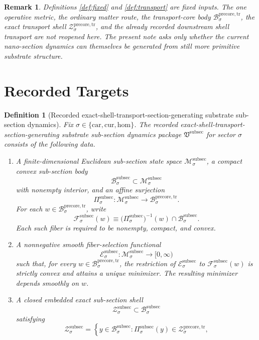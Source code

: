 \documentclass[11pt]{article}
\newcommand{\Car}{\mathrm{car}}
\newcommand{\Cur}{\mathrm{cur}}
\newcommand{\Hom}{\mathrm{hom}}
\newcommand{\PreCoreTrBody}[1]{\mathcal B_{#1}^{\mathrm{precore,tr}}}
\newcommand{\PreCoreTrShell}[1]{\mathcal Z_{#1}^{\mathrm{precore,tr}}}
\newcommand{\SubSectionPackage}{\mathfrak V^{\mathrm{subsec}}}
\newcommand{\SubSectionSpace}[1]{\mathcal M_{#1}^{\mathrm{subsec}}}
\newcommand{\SubSectionBody}[1]{\mathcal B_{#1}^{\mathrm{subsec}}}
\newcommand{\SubSectionProj}[1]{\Pi_{#1}^{\mathrm{subsec}}}
\newcommand{\SubSectionFiber}[2]{\mathcal F_{#1}^{\mathrm{subsec}}(#2)}
\newcommand{\SubSectionFunctional}[1]{\mathscr E_{#1}^{\mathrm{subsec}}}
\newcommand{\SubSectionShell}[1]{\mathcal Z_{#1}^{\mathrm{subsec}}}
\newtheorem{definition}{Definition}
\newtheorem{remark}{Remark}
\begin{document}
\begin{remark}
Definitions \ref{def:fixed} and \ref{def:transport} are fixed inputs. The one operative metric, the ordinary matter route, the transport-core body \(\PreCoreTrBody{\sigma}\), the exact transport shell \(\PreCoreTrShell{\sigma}\), and the already recorded downstream shell transport are not reopened here. The present note asks only whether the current nano-section dynamics can themselves be generated from still more primitive substrate structure.
\end{remark}

\section{Recorded Targets}

\begin{definition}[Recorded exact-shell-transport-section-generating substrate sub-section dynamics]
\label{def:subsec}
Fix \(\sigma\in\{\Car,\Cur,\Hom\}\). The recorded exact-shell-transport-section-generating substrate sub-section dynamics package \(\SubSectionPackage\) for sector \(\sigma\) consists of the following data.
\begin{enumerate}
    \item A finite-dimensional Euclidean sub-section state space \(\SubSectionSpace{\sigma}\), a compact convex sub-section body
    \[
    \SubSectionBody{\sigma}\subset\SubSectionSpace{\sigma}
    \]
    with nonempty interior, and an affine surjection
    \[
    \SubSectionProj{\sigma}:\SubSectionSpace{\sigma}\to\PreCoreTrBody{\sigma}.
    \]
    For each \(w\in\PreCoreTrBody{\sigma}\), write
    \[
    \SubSectionFiber{\sigma}{w}
    \equiv
    \bigl(\SubSectionProj{\sigma}\bigr)^{-1}(w)\cap\SubSectionBody{\sigma}.
    \]
    Each such fiber is required to be nonempty, compact, and convex.
    \item A nonnegative smooth fiber-selection functional
    \[
    \SubSectionFunctional{\sigma}:\SubSectionSpace{\sigma}\to[0,\infty)
    \]
    such that, for every \(w\in\PreCoreTrBody{\sigma}\), the restriction of \(\SubSectionFunctional{\sigma}\) to \(\SubSectionFiber{\sigma}{w}\) is strictly convex and attains a unique minimizer. The resulting minimizer depends smoothly on \(w\).
    \item A closed embedded exact sub-section shell
    \[
    \SubSectionShell{\sigma}\subset\SubSectionBody{\sigma}
    \]
    satisfying
    \[
    \SubSectionShell{\sigma}
    =
    \left\{
    y\in\SubSectionBody{\sigma}:
    \SubSectionProj{\sigma}(y)\in\PreCoreTrShell{\sigma},
\]
\end{enumerate}
\end{definition}
\end{document}
